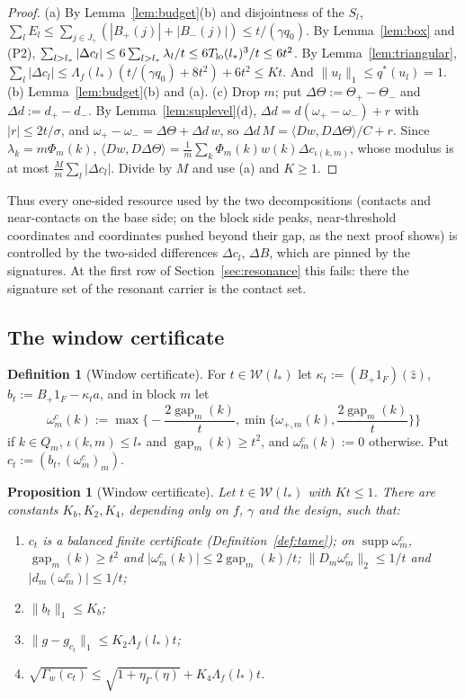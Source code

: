 \documentclass[10pt]{amsart}
\newtheorem{proposition}[theorem]{Proposition}
\theoremstyle{definition}
\newtheorem{definition}[theorem]{Definition}
\theoremstyle{remark}
\newcommand{\supp}{\operatorname{supp}}
\newcommand{\gap}{\operatorname{gap}}
\newcommand{\zh}{\hat z}
\newcommand{\ip}[2]{\langle #1,#2\rangle}
\begin{document}
\begin{proof}
(a) By Lemma~\ref{lem:budget}(b) and disjointness of the $S_l$,
$\sum_lE_l\le\sum_{j\in J_\gamma}(|B_+(j)|+|B_-(j)|)\le t/(\gamma q_0)$.  By
Lemma~\ref{lem:box} and (P2), $\sum_{l>l_*}|\Delta c_l|\le6\sum_{l>l_*}
\lambda_l/t\le6T_{\rm lo}(l_*)^3/t\le6t^2$.  By Lemma~\ref{lem:triangular},
$\sum_l|\Delta c_l|\le\Lambda_f(l_*)(t/(\gamma q_0)+8t^2)+6t^2\le Kt$.  And
$\|u_l\|_1\le q^*(u_l)=1$.  (b) Lemma~\ref{lem:budget}(b) and (a).
(c) Drop $m$; put $\Delta\Theta:=\Theta_+-\Theta_-$ and $\Delta d:=d_+-d_-$.
By Lemma~\ref{lem:suplevel}(d), $\Delta d=d(\omega_+-\omega_-)+r$ with
$|r|\le2t/\sigma$, and $\omega_+-\omega_-=\Delta\Theta+\Delta d\,w$, so
$\Delta d\,M=\ip{Dw}{D\Delta\Theta}/C+r$.  Since $\lambda_k=m\Phi_m(k)$,
$\ip{Dw}{D\Delta\Theta}=\frac1m\sum_k\Phi_m(k)w(k)\Delta c_{\iota(k,m)}$,
whose modulus is at most $\frac Mm\sum_l|\Delta c_l|$.  Divide by $M$ and
use (a) and $K\ge1$.
\end{proof}

Thus every one-sided resource used by the two decompositions (contacts and
near-contacts on the base side; on the block side peaks, near-threshold
coordinates and coordinates pushed beyond their gap, as the next proof
shows) is controlled by the two-sided differences $\Delta c_l$, $\Delta B$,
which are pinned by the signatures.  At the first row of
Section~\ref{sec:resonance} this fails: there the signature set of the
resonant carrier is the contact set.

\subsection{The window certificate}

\begin{definition}[Window certificate]\label{def:windowcert}
For $t\in\mathcal W(l_*)$ let $\kappa_t:=(B_+1_F)(\zh)$,
$b_t:=B_+1_F-\kappa_ta$, and in block $m$ let
\[
 \omega^c_m(k):=\max\Big\{-\frac{2\gap_m(k)}t,\min\Big\{\omega_{+,m}(k),
 \frac{2\gap_m(k)}t\Big\}\Big\}
\]
if $k\in Q_m$, $\iota(k,m)\le l_*$ and $\gap_m(k)\ge t^2$, and
$\omega^c_m(k):=0$ otherwise.  Put $c_t:=(b_t,(\omega^c_m)_m)$.
\end{definition}

\begin{proposition}[Window certificate]\label{prop:windowcert}
Let $t\in\mathcal W(l_*)$ with $Kt\le1$.  There are constants $K_b,K_2,K_4$,
depending only on $f$, $\gamma$ and the design, such that:
\begin{enumerate}
\item[(a)] $c_t$ is a balanced finite certificate (Definition~\ref{def:tame});
on $\supp\omega^c_m$, $\gap_m(k)\ge t^2$ and $|\omega^c_m(k)|\le
2\gap_m(k)/t$; $\|D_m\omega^c_m\|_2\le1/t$ and $|d_m(\omega^c_m)|\le1/t$;
\item[(b)] $\|b_t\|_1\le K_b$;
\item[(c)] $\|g-g_{c_t}\|_1\le K_2\Lambda_f(l_*)t$;
\item[(d)] $\sqrt{\Gamma_w(c_t)}\le\sqrt{1+\eta_\Gamma(\eta)}+K_4\Lambda_f(l_*)t$.
\end{enumerate}
\end{proposition}
\end{document}
